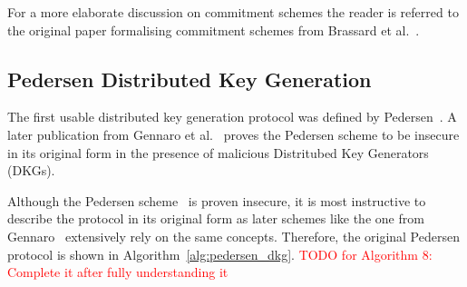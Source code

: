 For a more elaborate discussion on commitment schemes the reader is referred to the original paper formalising commitment schemes from Brassard et al.~\cite{art:BrassardCC88}.

\subsection{Pedersen Distributed Key Generation}
The first usable distributed key generation protocol was defined by Pedersen~\cite{art:Pedersen91a}. A later publication from Gennaro et al.~\cite{art:GennaroJKR07} proves the Pedersen scheme to be insecure in its original form in the presence of malicious Distritubed Key Generators (DKGs).

Although the Pedersen scheme~\cite{art:Pedersen91a} is proven insecure, it is most instructive to describe the protocol in its original form as later schemes like the one from Gennaro~\cite{art:GennaroJKR07} extensively rely on the same concepts. Therefore, the original Pedersen protocol is shown in Algorithm~\ref{alg:pedersen_dkg}. \textcolor{red}{TODO for Algorithm 8: Complete it after fully understanding it}



